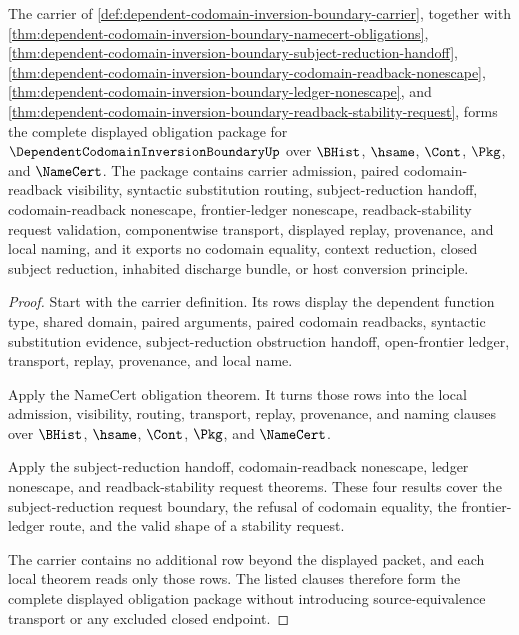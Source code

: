 \begin{theorem}
\label{thm:dependent-codomain-inversion-boundary-obligation-closure-package}
The carrier of \autoref{def:dependent-codomain-inversion-boundary-carrier}, together with \autoref{thm:dependent-codomain-inversion-boundary-namecert-obligations}, \autoref{thm:dependent-codomain-inversion-boundary-subject-reduction-handoff}, \autoref{thm:dependent-codomain-inversion-boundary-codomain-readback-nonescape}, \autoref{thm:dependent-codomain-inversion-boundary-ledger-nonescape}, and \autoref{thm:dependent-codomain-inversion-boundary-readback-stability-request}, forms the complete displayed obligation package for $\DependentCodomainInversionBoundaryUp$ over $\BHist$, $\hsame$, $\Cont$, $\Pkg$, and $\NameCert$. The package contains carrier admission, paired codomain-readback visibility, syntactic substitution routing, subject-reduction handoff, codomain-readback nonescape, frontier-ledger nonescape, readback-stability request validation, componentwise transport, displayed replay, provenance, and local naming, and it exports no codomain equality, context reduction, closed subject reduction, inhabited discharge bundle, or host conversion principle.
\end{theorem}
\begin{proof}
Start with the carrier definition. Its rows display the dependent function type, shared domain, paired arguments, paired codomain readbacks, syntactic substitution evidence, subject-reduction obstruction handoff, open-frontier ledger, transport, replay, provenance, and local name.

Apply the NameCert obligation theorem. It turns those rows into the local admission, visibility, routing, transport, replay, provenance, and naming clauses over $\BHist$, $\hsame$, $\Cont$, $\Pkg$, and $\NameCert$.

Apply the subject-reduction handoff, codomain-readback nonescape, ledger nonescape, and readback-stability request theorems. These four results cover the subject-reduction request boundary, the refusal of codomain equality, the frontier-ledger route, and the valid shape of a stability request.

The carrier contains no additional row beyond the displayed packet, and each local theorem reads only those rows. The listed clauses therefore form the complete displayed obligation package without introducing source-equivalence transport or any excluded closed endpoint.
\end{proof}

